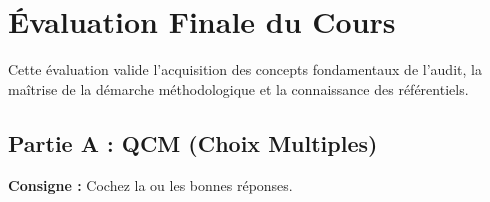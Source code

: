 
\chapter{Évaluation Finale du Cours}\label{chap:08_evaluation_finale}

Cette évaluation valide l'acquisition des concepts fondamentaux de l'audit, la maîtrise de la démarche méthodologique et la connaissance des référentiels.

\section{Partie A : QCM (Choix Multiples)}

\textbf{Consigne :} Cochez la ou les bonnes réponses.

